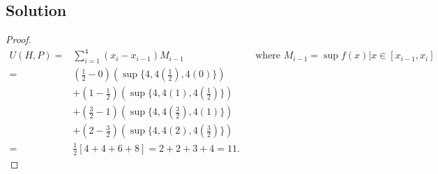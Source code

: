 \documentclass{article}
\theoremstyle{plain}
\begin{document}
\subsection*{Solution}
\begin{proof}
  \begin{align*}
U(H,P)=&\sum^{4}_{i=1}(x_{i}-x_{i-1})M_{i-1} &&\text{where }M_{i-1}=\sup{f(x)|x\in[x_{i-1},x_{i}]}\\
    =&(\frac{1}{2}-0)(\sup\{4,4(\frac{1}{2}),4(0)\})\\
    &+(1-\frac{1}{2})(\sup\{4,4(1),4(\frac{1}{2})\})\\
    &+(\frac{3}{2}-1)(\sup\{4,4(\frac{3}{2}),4(1)\})\\
       &+(2-\frac{3}{2})(\sup\{4,4(2),4(\frac{3}{2})\})\\
    =&\frac{1}{2}[4+4+6+8]=2+2+3+4=11.
  \end{align*}
\end{proof}
\end{document}
